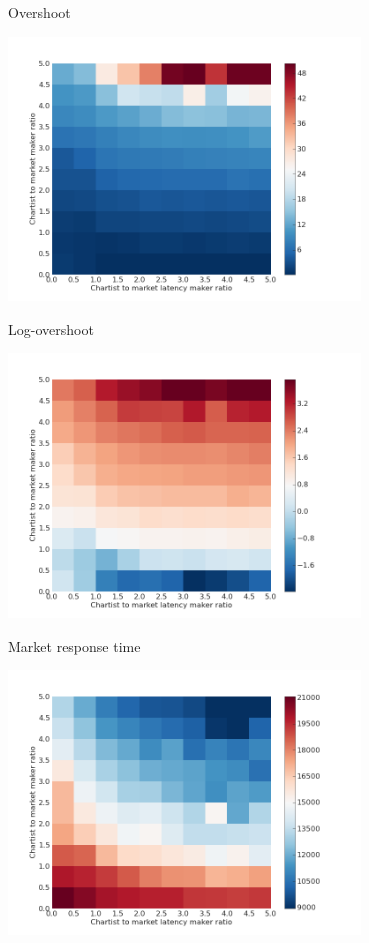 \documentclass[14pt]{beamer}
\begin{document}
\begin{frame}{Overshoot}
\begin{center}
\includegraphics[width=0.7\textwidth]{ratio/overshoot.png}
\end{center}
\end{frame}


\begin{frame}{Log-overshoot}
\begin{center}
\includegraphics[width=0.7\textwidth]{ratio/overshoot_log.png}
\end{center}
\end{frame}


\begin{frame}{Market response time}
\begin{center}
\includegraphics[width=0.7\textwidth]{ratio/time_to_reach_new_fundamental.png}
\end{center}
\end{frame}
\end{document}
